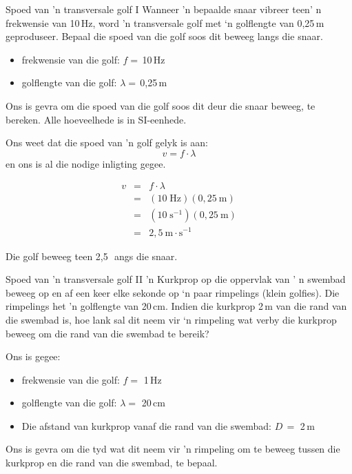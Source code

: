 \begin{definition}

\begin{wex}{Spoed van 'n transversale golf I }{Wanneer 'n bepaalde snaar vibreer teen' n frekwensie van 10\,Hz, word 'n transversale golf met ‘n 
      golflengte van 0,25\,m geproduseer. Bepaal die spoed van die golf soos dit beweeg langs
      die snaar.}
{
\begin{itemize}
\item{frekwensie van die golf: $f=$\,10\,Hz}
\item{golflengte van die golf: $\lambda=$\,0,25\,m}
\end{itemize}
Ons is gevra om die spoed van die golf soos dit deur die snaar beweeg, te bereken. Alle
      hoeveelhede is in SI-eenhede.

Ons weet dat die spoed van 'n golf gelyk is aan:
\begin{equation*}
v=f\cdot \lambda 
\end{equation*}
en ons is al die nodige inligting gegee.

\begin{eqnarray*}
v&=&f\cdot \lambda\\
&=&(10\;\text{Hz})(0,25~\text{m})\\
&=&(10\;\text{s}^{-1})(0,25~\text{m})\\
&=&2,5~\text{m} \cdot \text{s}^{-1}
\end{eqnarray*}

Die golf beweeg teen 2,5\,\ms\ angs die snaar.
}
\end{wex}


\begin{wex}{Spoed van 'n transversale golf II}{ 'n Kurkprop op die oppervlak van ' n swembad beweeg op en af ​​een keer elke sekonde op
    ‘n paar rimpelings (klein golfies). Die rimpelings het 'n golflengte van  20\,cm. Indien die kurkprop 2\,m van die
    rand van die swembad is, hoe lank sal dit neem vir ‘n rimpeling wat verby die kurkprop beweeg om die rand
    van die swembad te bereik?}{
Ons is gegee:
\begin{itemize}
\item{frekwensie van die golf: $f =$ 1\,Hz}
\item{golflengte van die golf: $\lambda =$ 20\,cm}
\item{Die afstand van kurkprop vanaf die rand van die swembad:  $D\,=$ 2\,m}
\end{itemize}
Ons is gevra om die tyd wat dit neem vir 'n rimpeling om te beweeg tussen die kurkprop
    en die rand van die swembad, te bepaal.

}
\end{wex}
\end{definition}

